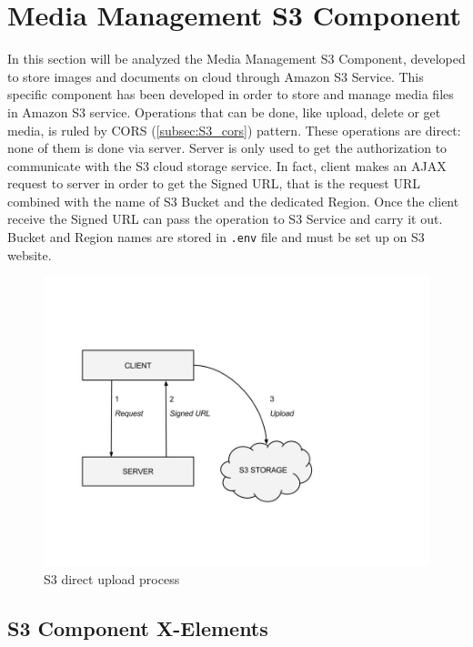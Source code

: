 \section{Media Management S3 Component}
\label{sec:S3_component}

In this section will be analyzed the Media Management S3 Component, developed to store images and documents on cloud through Amazon S3 Service.
This specific component has been developed in order to store and manage media files in Amazon S3 service.
Operations that can be done, like upload, delete or get media, is ruled by CORS (\ref{subsec:S3_cors}) pattern.
These operations are direct: none of them is done via server. Server is only used to get the authorization to communicate with the S3 cloud storage service.
In fact, client makes an AJAX request to server in order to get the Signed URL, that is the request URL combined with the name of S3 Bucket and the dedicated Region. 
Once the client receive the Signed URL can pass the operation to S3 Service and carry it out.
Bucket and Region names are stored in \texttt{.env} file and must be set up on S3 website.

\begin {figure}[h]
\graphicspath{{images/chapter_s3/}}
\includegraphics[width=\textwidth]{s3_upload}
\caption{S3 direct upload process}
\end {figure}



\subsection{S3 Component X-Elements}
\label{subsec:S3_server_elem}

